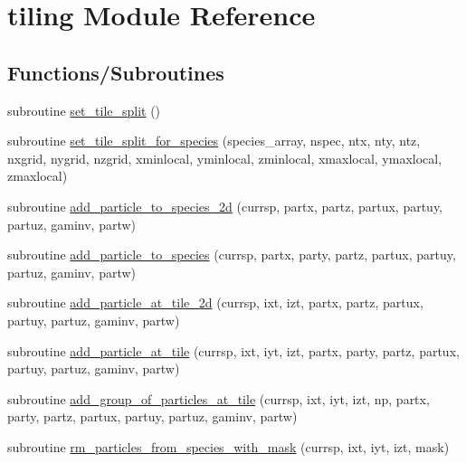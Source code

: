 \hypertarget{namespacetiling}{}\section{tiling Module Reference}
\label{namespacetiling}
\subsection*{Functions/\+Subroutines}
\begin{DoxyCompactItemize}
\item 
subroutine \hyperlink{namespacetiling_ae08843ba623397e395f3cdc2e10ffc12}{set\+\_\+tile\+\_\+split} ()
\item 
subroutine \hyperlink{namespacetiling_a57bd64d1c926175fa558ed14e0a9f395}{set\+\_\+tile\+\_\+split\+\_\+for\+\_\+species} (species\+\_\+array, nspec, ntx, nty, ntz, nxgrid, nygrid, nzgrid,                   xminlocal, yminlocal, zminlocal, xmaxlocal, ymaxlocal, zmaxlocal)
\item 
subroutine \hyperlink{namespacetiling_a6d78403de2ce67688301c28455638363}{add\+\_\+particle\+\_\+to\+\_\+species\+\_\+2d} (currsp, partx, partz,                                                       partux, partuy, partuz, gaminv, partw)
\item 
subroutine \hyperlink{namespacetiling_a4aaddc2230da22ad8bf1bb439f24b3ee}{add\+\_\+particle\+\_\+to\+\_\+species} (currsp, partx, party, partz,                                                       partux, partuy, partuz, gaminv, partw)
\item 
subroutine \hyperlink{namespacetiling_acd2c914a7012265a66a69aedbb714ab9}{add\+\_\+particle\+\_\+at\+\_\+tile\+\_\+2d} (currsp, ixt, izt, partx, partz,                                                           partux, partuy, partuz, gaminv, partw)
\item 
subroutine \hyperlink{namespacetiling_a359fbc74072f7cc701885efa8440a648}{add\+\_\+particle\+\_\+at\+\_\+tile} (currsp, ixt, iyt, izt, partx, party, partz,                                                           partux, partuy, partuz, gaminv, partw)
\item 
subroutine \hyperlink{namespacetiling_a95ecc37c280961f5c094916b0fbf9724}{add\+\_\+group\+\_\+of\+\_\+particles\+\_\+at\+\_\+tile} (currsp, ixt, iyt, izt, np, partx, party,                                           partz, partux, partuy, partuz, gaminv, partw)
\item 
subroutine \hyperlink{namespacetiling_ad4f03c522071b6b40bc01c16b5aa1bdd}{rm\+\_\+particles\+\_\+from\+\_\+species\+\_\+with\+\_\+mask} (currsp, ixt, iyt, izt, mask)

\end{DoxyCompactItemize}
